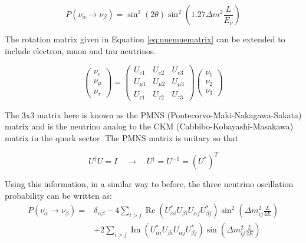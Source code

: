 \documentclass[11pt,oneside,a4paper]{article}
\begin{document}
\begin{equation}
\label{eq:twoflavprob}
P\left(\nu_{\alpha} \rightarrow \nu_{\beta}\right)=\sin ^{2}(2 \theta) \sin ^{2}\left(1.27 \Delta m^{2} \frac{L}{E_{\nu}}\right)
\end{equation}

The rotation matrix given in Equation \ref{eq:nuemuematrix} can be extended to include electron, muon and tau neutrinos.

\begin{equation}
\left( \begin{array}{c}{\nu_{e}} \\ {\nu_{\mu}} \\ {\nu_{\tau}}\end{array}\right)=\left( \begin{array}{lll}{U_{e 1}} & {U_{e 2}} & {U_{e 3}} \\ {U_{\mu 1}} & {U_{\mu 2}} & {U_{\mu 3}} \\ {U_{\tau 1}} & {U_{\tau 2}} & {U_{\tau 3}}\end{array}\right) \left( \begin{array}{c}{\nu_{1}} \\ {\nu_{2}} \\ {\nu_{3}}\end{array}\right)
\end{equation}

The 3x3 matrix here is known as the PMNS (Pontecorvo-Maki-Nakagawa-Sakata) matrix and is the neutrino analog to the CKM (Cabbibo-Kobayashi-Masakawa) matrix in the quark sector. The PMNS matrix is unitary so that

\begin{equation}
\label{eq:PMNS}
U^{\dagger} U=I \quad \rightarrow \quad U^{\dagger}=U^{-1}=\left(U^{*}\right)^{T}
\end{equation}

Using this information, in a similar way to before, the three neutrino oscillation probability can be written as:
\begin{equation}
\begin{aligned} P\left(\nu_{\alpha} \rightarrow \nu_{\beta}\right)=& \delta_{\alpha \beta}-4 \sum_{i>j} \operatorname{Re}\left(U_{\alpha i}^{*} U_{\beta i} U_{\alpha j} U_{\beta j}^{*}\right) \sin ^{2}\left(\Delta m_{i j}^{2} \frac{L}{4 E}\right) \\ &+2 \sum_{i>j} \operatorname{Im}\left(U_{\alpha i}^{*} U_{\beta i} U_{\alpha j} U_{\beta j}^{*}\right) \sin \left(\Delta m_{i j}^{2} \frac{L}{2 E}\right) \end{aligned}
\end{equation}
\end{document}
